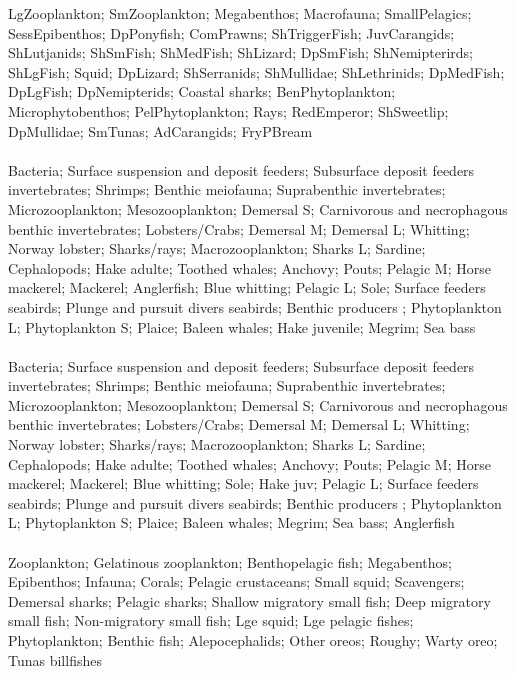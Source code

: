 \hline
LgZooplankton; SmZooplankton; Megabenthos; Macrofauna; SmallPelagics; SessEpibenthos; DpPonyfish; ComPrawns; ShTriggerFish; JuvCarangids; ShLutjanids; ShSmFish; ShMedFish; ShLizard; DpSmFish; ShNemipterirds; ShLgFish; Squid; DpLizard; ShSerranids; ShMullidae; ShLethrinids; DpMedFish; DpLgFish; DpNemipterids; Coastal sharks; BenPhytoplankton; Microphytobenthos; PelPhytoplankton; Rays; RedEmperor; ShSweetlip; DpMullidae; SmTunas; AdCarangids; FryPBream\\
\fullhline
\hline
{} \\
\hline
Bacteria; Surface suspension and deposit feeders; Subsurface deposit feeders invertebrates; Shrimps; Benthic meiofauna; Suprabenthic invertebrates; Microzooplankton; Mesozooplankton; Demersal S; Carnivorous and necrophagous benthic invertebrates; Lobsters/Crabs; Demersal M; Demersal L; Whitting; Norway lobster; Sharks/rays; Macrozooplankton; Sharks L; Sardine; Cephalopods; Hake adulte; Toothed whales; Anchovy; Pouts; Pelagic M; Horse mackerel; Mackerel; Anglerfish; Blue whitting; Pelagic L; Sole; Surface feeders seabirds; Plunge and pursuit divers seabirds; Benthic producers ; Phytoplankton L; Phytoplankton S; Plaice; Baleen whales; Hake juvenile; Megrim; Sea bass\\
\fullhline
\hline
{} \\
\hline
Bacteria; Surface suspension and deposit feeders; Subsurface deposit feeders invertebrates; Shrimps; Benthic meiofauna; Suprabenthic invertebrates; Microzooplankton; Mesozooplankton; Demersal S; Carnivorous and necrophagous benthic invertebrates; Lobsters/Crabs; Demersal M; Demersal L; Whitting; Norway lobster; Sharks/rays; Macrozooplankton; Sharks L; Sardine; Cephalopods; Hake adulte; Toothed whales; Anchovy; Pouts; Pelagic M; Horse mackerel; Mackerel; Blue whitting; Sole; Hake juv; Pelagic L; Surface feeders seabirds; Plunge and pursuit divers seabirds; Benthic producers ; Phytoplankton L; Phytoplankton S; Plaice; Baleen whales; Megrim; Sea bass; Anglerfish\\
\fullhline
\hline
{} \\
\hline
Zooplankton; Gelatinous zooplankton; Benthopelagic fish; Megabenthos; Epibenthos; Infauna; Corals; Pelagic crustaceans; Small squid; Scavengers; Demersal sharks; Pelagic sharks; Shallow migratory small fish; Deep migratory small fish; Non-migratory small fish; Lge squid; Lge pelagic fishes; Phytoplankton; Benthic fish; Alepocephalids; Other oreos; Roughy; Warty oreo; Tunas  billfishes\\
